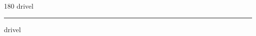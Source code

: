 
\begin{frame}
\begin{center}
\begin{turn}{180}
{\fontsize{2.5cm}{1em}\selectfont drivel}
\end{turn}
\vspace{1em}\par  
\hrule
\vspace{1em}\par  
{\fontsize{2.5cm}{1em}\selectfont drivel}
\end{center}
\end{frame}

